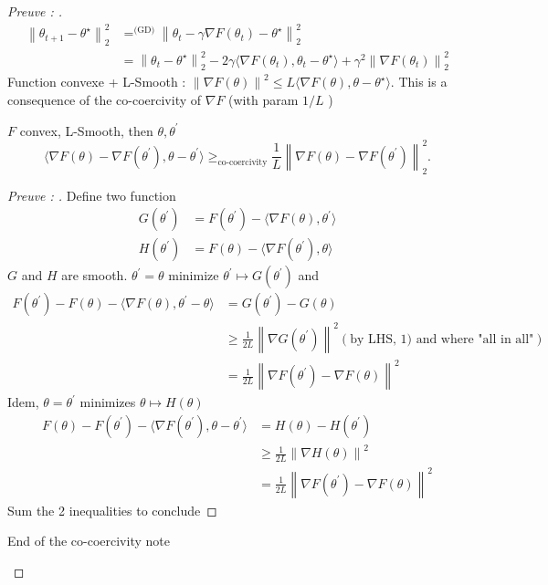 \begin{proof}[Preuve : ]
    \begin{align*}
        \left\| \theta _{t+1} - \theta ^\star  \right\| ^2 _2  
            &= ^{\text{(GD)}} \left\| \theta _t - \gamma \nabla F(\theta _t) - \theta ^\star  \right\| ^2 _2 \\
            &= \left\| \theta _t - \theta ^\star  \right\| ^2 _2 - 2 \gamma  \langle \nabla F(\theta _t), \theta _t - \theta ^\star \rangle + \gamma ^2 \left\| \nabla F(\theta _t) \right\| ^2 _2
    \end{align*}
    Function convexe + L-Smooth : $ \left\| \nabla F(\theta ) \right\| ^2 \leq L \langle \nabla F(\theta ), \theta  - \theta ^\star \rangle $. This is a consequence of the co-coercivity of $ \nabla F $ (with param $ 1/L $ )
    \begin{note}[Co-coercivity]
        $ F $ convex, L-Smooth, then $ \theta , \theta ^\prime  $ 
        \[
            \langle  \nabla F(\theta ) - \nabla F(\theta ^\prime ), \theta  - \theta ^\prime \rangle \geq_{\text{co-coercivity}} \frac{1}{L} \left\| \nabla F(\theta ) - \nabla F(\theta ^\prime ) \right\| ^2 _2
        .\]
        \begin{proof}[Preuve : ]
            Define two function \begin{align*}
                G(\theta ^\prime ) &= F(\theta ^\prime ) - \langle \nabla F(\theta ) , \theta ^\prime \rangle  \\
                H(\theta ^\prime ) &= F(\theta ) - \langle \nabla F(\theta ^\prime ), \theta \rangle 
            \end{align*}
            $ G $ and $ H $ are smooth. $ \theta ^\prime = \theta  $ minimize $ \theta ^\prime  \mapsto G(\theta ^\prime ) $ and 
            \begin{align*}
                F(\theta ^\prime) - F(\theta ) - \langle \nabla F(\theta ) , \theta ^\prime - \theta  \rangle
                    &= G(\theta ^\prime) - G(\theta ) \\
                    &\geq \frac{1}{2L} \left\| \nabla G(\theta ^\prime ) \right\| ^2 (\text{by LHS, 1) and where "all in all"} ) \\
                    &= \frac{1}{2L} \left\| \nabla F(\theta ^\prime ) - \nabla F(\theta ) \right\| ^2
            \end{align*} 
            Idem, $ \theta  = \theta ^\prime  $ minimizes $ \theta \mapsto H(\theta ) $ 
            \begin{align*}
                F(\theta ) - F(\theta ^\prime ) - \langle \nabla F(\theta ^\prime ), \theta  - \theta ^\prime \rangle &= H (\theta ) - H(\theta ^\prime ) \\
                &\geq \frac{1}{2L} \left\| \nabla H(\theta )  \right\| ^2 \\
                &= \frac{1}{2L} \left\| \nabla F(\theta ^\prime ) - \nabla F(\theta ) \right\| ^2
            \end{align*}
            Sum the 2 inequalities to conclude
        \end{proof}
        End of the co-coercivity note
    \end{note}
    

\end{proof}
